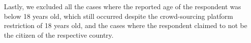 \documentclass[11pt, ngerman,english,a4]{article}
\begin{document}
Lastly, we excluded all the cases where the reported age of the respondent was below 18 years old, which still occurred despite the crowd-sourcing platform restriction of 18 years old, and the cases where the respondent claimed to not be the citizen of the respective country. 



\end{document}
